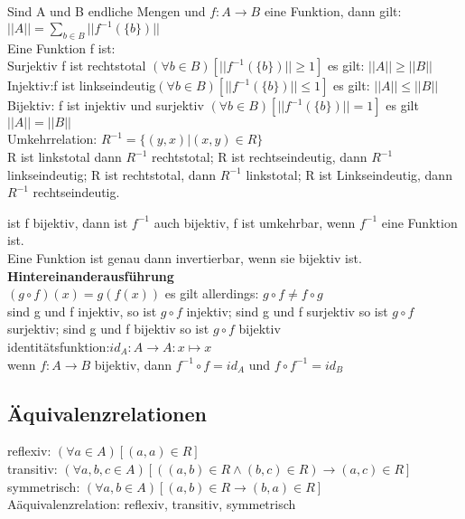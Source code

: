 \documentclass[a4paper]{scrartcl}
\begin{document}
Sind A und B endliche Mengen und $f: A \to B$ eine Funktion, dann gilt:\\ $||A|| = \sum\limits_{b\in B} ||f^{-1}
(\{b\})||$\\

Eine Funktion f ist:\\
Surjektiv f ist rechtstotal $(\forall b \in B)[||f^{-1}(\{b\})|| \geq 1]$ es gilt: $||A|| \geq ||B||$\\
Injektiv:f ist linkseindeutig$(\forall b \in B)[||f^{-1}(\{b\})|| \leq 1]$ es gilt: $||A||\leq ||B||$\\
Bijektiv: f ist injektiv und surjektiv $(\forall b \in B)[||f^{-1}(\{b\})|| = 1]$ es gilt $||A|| = ||B||$\\

Umkehrrelation: $R^{-1} = \{(y,x)|(x,y)\in R\}$\\
R ist linkstotal dann $R^{-1}$ rechtstotal; R ist rechtseindeutig, dann $R^{-1}$ linkseindeutig; R ist rechtstotal, dann $R^{-1}$ linkstotal; R ist Linkseindeutig, dann $R^{-1}$ rechtseindeutig.

ist f bijektiv, dann ist $f^{-1}$ auch bijektiv, f ist umkehrbar, wenn $f^{-1}$ eine Funktion ist.\\ Eine Funktion ist genau dann invertierbar, wenn sie bijektiv ist.\\

\textbf{Hintereinanderausführung}\\
$(g \circ f)(x) = g(f(x))$ es gilt allerdings: $ g\circ f \neq f \circ g$\\
sind g und f injektiv, so ist $g \circ f$ injektiv; sind g und f surjektiv so ist $g\circ f$ surjektiv; sind g und f bijektiv so ist $g\circ f$ bijektiv\\
identitätsfunktion:$id_A: A \to A: x \mapsto x$\\
wenn $f: A \to B$  bijektiv, dann $f^{-1} \circ f = id_A$ und $ f \circ f^{-1} = id_B$\\


\subsection{Äquivalenzrelationen}
reflexiv: $(\forall a\in A)[(a,a) \in R]$\\
transitiv: $(\forall a,b,c \in A)[((a,b)\in R \wedge (b,c)\in R) \to (a,c)\in R]$\\
symmetrisch: $(\forall a,b \in A)[(a,b)\in R \to (b,a) \in R]$\\
Aäquivalenzrelation: reflexiv, transitiv, symmetrisch\\
\end{document}
